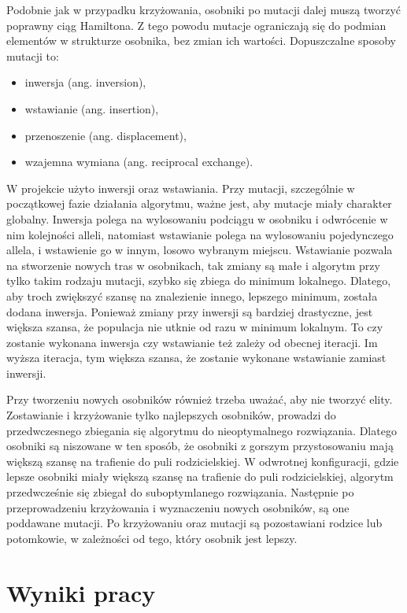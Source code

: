 \documentclass{article}
\begin{document}
Podobnie jak w przypadku krzyżowania, osobniki po mutacji dalej muszą tworzyć
poprawny ciąg Hamiltona. Z tego powodu mutacje ograniczają się do podmian
elementów w strukturze osobnika, bez zmian ich wartości. Dopuszczalne sposoby
mutacji to:
\begin{itemize}
    \item inwersja (ang. inversion),
    \item wstawianie (ang. insertion),
    \item przenoszenie (ang. displacement),
    \item wzajemna wymiana (ang. reciprocal exchange).
\end{itemize}
W projekcie użyto inwersji oraz wstawiania. Przy mutacji, szczególnie w
początkowej fazie działania algorytmu, ważne jest, aby mutacje miały charakter
globalny. Inwersja polega na wylosowaniu podciągu w osobniku i odwrócenie w nim
kolejności alleli, natomiast wstawianie polega na wylosowaniu pojedynczego
allela, i wstawienie go w innym, losowo wybranym miejscu. Wstawianie pozwala na
stworzenie nowych tras w osobnikach, tak zmiany są małe i algorytm przy tylko
takim rodzaju mutacji, szybko się zbiega do minimum lokalnego. Dlatego, aby
troch zwiększyć szansę na znalezienie innego, lepszego minimum, została dodana
inwersja. Ponieważ zmiany przy inwersji są bardziej drastyczne, jest większa
szansa, że populacja nie utknie od razu w minimum lokalnym. To czy zostanie
wykonana inwersja czy wstawianie też zależy od obecnej iteracji. Im wyższa
iteracja, tym większa szansa, że zostanie wykonane wstawianie zamiast inwersji.

Przy tworzeniu nowych osobników również trzeba uważać, aby nie tworzyć elity.
Zostawianie i krzyżowanie tylko najlepszych osobników, prowadzi do
przedwczesnego zbiegania się algorytmu do nieoptymalnego rozwiązania. Dlatego
osobniki są niszowane w ten sposób, że osobniki z gorszym przystosowaniu mają
większą szansę na trafienie do puli rodzicielskiej. W odwrotnej konfiguracji,
gdzie lepsze osobniki miały większą szansę na trafienie do puli rodzicielskiej,
algorytm przedwcześnie się zbiegał do suboptymlanego rozwiązania. Następnie po
przeprowadzeniu krzyżowania i wyznaczeniu nowych osobników, są one poddawane
mutacji. Po krzyżowaniu oraz mutacji są pozostawiani rodzice lub potomkowie, w
zależności od tego, który osobnik jest lepszy.

\section{Wyniki pracy}
\end{document}
